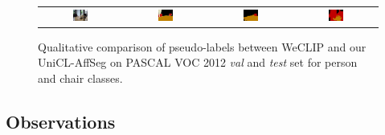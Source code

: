 \begin{figure}[ht]
\begin{tcolorbox}[colframe=black!60, colback=white, boxrule=0.8pt, arc=2pt, left=2pt, right=2pt, top=2pt, bottom=2pt]
\begin{tabular}{cccc}
      
      \includegraphics[width=0.20\textwidth,height=0.20\textwidth]
      {figures/person_and_chair/originals/2008_003477}
                &
      \includegraphics[width=0.20\textwidth,height=0.20\textwidth]
      {figures/person_and_chair/gt/2008_003477}
                &
      \includegraphics[width=0.20\textwidth,height=0.20\textwidth]
      {figures/person_and_chair/weclip/2008_003477_[8, 10]}
                &
      \includegraphics[width=0.20\textwidth,height=0.20\textwidth]
      {figures/person_and_chair/ours/2008_003477_[8, 10]}    \\


    \end{tabular}

    \caption{Qualitative comparison of pseudo-labels between WeCLIP and our UniCL-AffSeg on PASCAL VOC 2012 \textit{val} and \textit{test} set for person and chair classes.}
    \label{fig:qualitative_comparison_pseudolabel_person_chair}
  \end{tcolorbox}
\end{figure}

\subsection{Observations}

